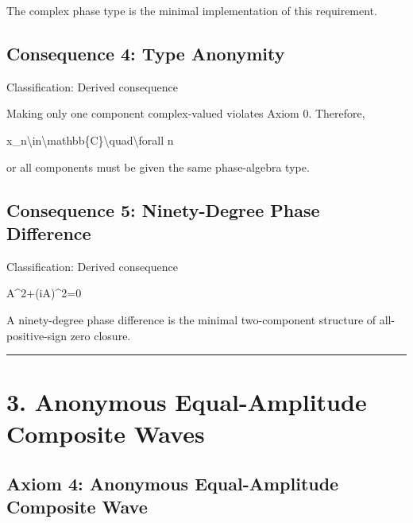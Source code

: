 \documentclass[
  a4paper,
]{article}
\newenvironment{Shaded}{}{}
\newcommand{\NormalTok}[1]{#1}
\begin{document}
The complex phase type is the minimal implementation of this
requirement.

\subsection{Consequence 4: Type
Anonymity}\label{consequence-4-type-anonymity}

Classification: Derived consequence

Making only one component complex-valued violates Axiom 0. Therefore,

\begin{Shaded}
\begin{Highlighting}[]
\NormalTok{x\_n\textbackslash{}in\textbackslash{}mathbb\{C\}\textbackslash{}quad\textbackslash{}forall n}
\end{Highlighting}
\end{Shaded}

or all components must be given the same phase-algebra type.

\subsection{Consequence 5: Ninety-Degree Phase
Difference}\label{consequence-5-ninety-degree-phase-difference}

Classification: Derived consequence

\begin{Shaded}
\begin{Highlighting}[]
\NormalTok{A\^{}2+(iA)\^{}2=0}
\end{Highlighting}
\end{Shaded}

A ninety-degree phase difference is the minimal two-component structure
of all-positive-sign zero closure.

\begin{center}\rule{0.5\linewidth}{0.5pt}\end{center}

\section{3. Anonymous Equal-Amplitude Composite
Waves}\label{anonymous-equal-amplitude-composite-waves}

\subsection{Axiom 4: Anonymous Equal-Amplitude Composite
Wave}\label{axiom-4-anonymous-equal-amplitude-composite-wave}
\end{document}
